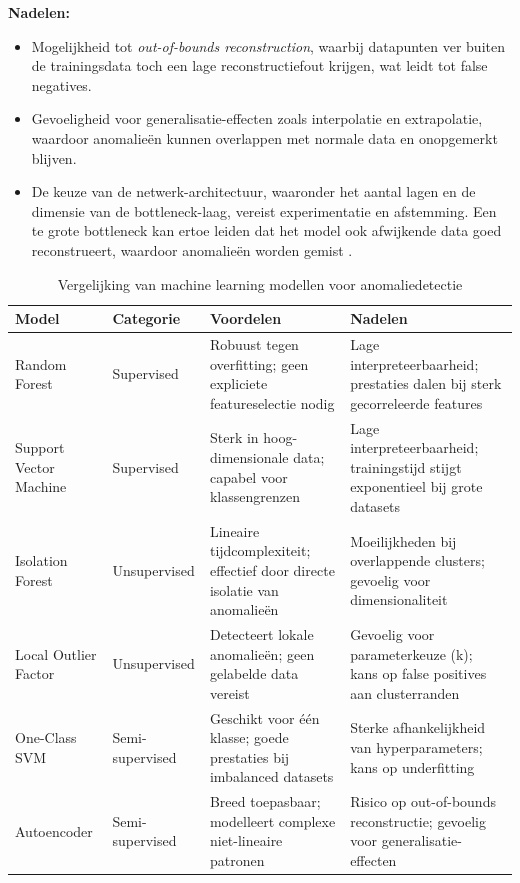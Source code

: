 \textbf{Nadelen:}
\begin{itemize}
    \item Mogelijkheid tot \textit{out-of-bounds reconstruction}, waarbij
    datapunten ver buiten de trainingsdata toch een lage reconstructiefout
    krijgen, wat leidt tot false negatives.
    \item Gevoeligheid voor generalisatie-effecten zoals interpolatie en
    extrapolatie, waardoor anomalieën kunnen overlappen met normale data en
    onopgemerkt blijven\autocite{Bouman2025}.
    \item De keuze van de netwerk-architectuur, waaronder het aantal lagen en de dimensie van de bottleneck-laag, vereist experimentatie en afstemming. Een te grote bottleneck kan ertoe leiden dat het model ook afwijkende data goed reconstrueert, waardoor anomalieën worden gemist \autocite{Chikezie2025}.
\end{itemize}
\clearpage
\begin{table}[H]
    \centering
    \caption{Vergelijking van machine learning modellen voor anomaliedetectie}
    \label{tab:ml-modellen-vergelijking}
    \begin{tabular}{p{3cm} p{2.8cm} p{4.5cm} p{4.5cm}}
    \toprule
    \textbf{Model} & \textbf{Categorie} & \textbf{Voordelen} & \textbf{Nadelen} \\
    \midrule
    Random Forest 
      & Supervised 
      & Robuust tegen overfitting; geen expliciete featureselectie nodig 
      & Lage interpreteerbaarheid; prestaties dalen bij sterk gecorreleerde features \\
    \addlinespace
    Support Vector Machine 
      & Supervised 
      & Sterk in hoog-dimensionale data; capabel voor klassengrenzen 
      & Lage interpreteerbaarheid; trainingstijd stijgt exponentieel bij grote datasets \\
    \addlinespace
    Isolation Forest 
      & Unsupervised 
      & Lineaire tijdcomplexiteit; effectief door directe isolatie van anomalieën 
      & Moeilijkheden bij overlappende clusters; gevoelig voor dimensionaliteit \\
    \addlinespace
    Local Outlier Factor 
      & Unsupervised 
      & Detecteert lokale anomalieën; geen gelabelde data vereist 
      & Gevoelig voor parameterkeuze (k); kans op false positives aan clusterranden \\
    \addlinespace
    One-Class SVM 
      & Semi-supervised 
      & Geschikt voor één klasse; goede prestaties bij imbalanced datasets 
      & Sterke afhankelijkheid van hyperparameters; kans op underfitting \\
    \addlinespace
    Autoencoder 
      & Semi-supervised 
      & Breed toepasbaar; modelleert complexe niet-lineaire patronen 
      & Risico op out-of-bounds reconstructie; gevoelig voor generalisatie-effecten \\
    \bottomrule
    \end{tabular}
\end{table}
\clearpage

